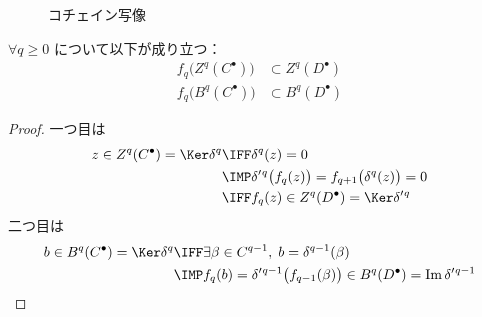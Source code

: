 \documentclass[algtopo_main]{subfiles}
\begin{document}
\begin{figure}[H]
    \centering
    \caption{コチェイン写像}
    \label{fig:cochainmap}
\end{figure}%



\begin{mylem}[label=lem:chain1]{}
    $\forall q \ge 0$ について以下が成り立つ：
    \begin{align}
        f_q \bigl( Z^q(C^\bullet) \bigr) &\subset Z^q(D^\bullet) \\
        f_q \bigl( B^q(C^\bullet) \bigr) &\subset B^q(D^\bullet)
    \end{align}
\end{mylem}

\begin{proof}
    一つ目は
    \begin{align}
        z \in Z^q(C^\bullet) = \Ker \delta^q &\IFF \delta^q(z) = 0 \\
        &\IMP \delta'{}^q \bigl( f_q(z) \bigr) = f_{q+1} \bigl( \delta^q(z) \bigr) = 0 \\
        &\IFF f_q(z) \in Z^q(D^\bullet) = \Ker \delta'{}^q
    \end{align}
    二つ目は
    \begin{align}
        b \in B^q(C^\bullet) = \Ker \delta^q &\IFF \exists \beta \in C^{q-1},\; b = \delta^{q-1}(\beta)\\
        &\IMP f_q(b) = \delta'{}^{q-1} \bigl( f_{q-1}(\beta) \bigr)  \in B^q(D^\bullet) = \Im \delta'{}^{q-1}
    \end{align}
\end{proof}
\end{document}
